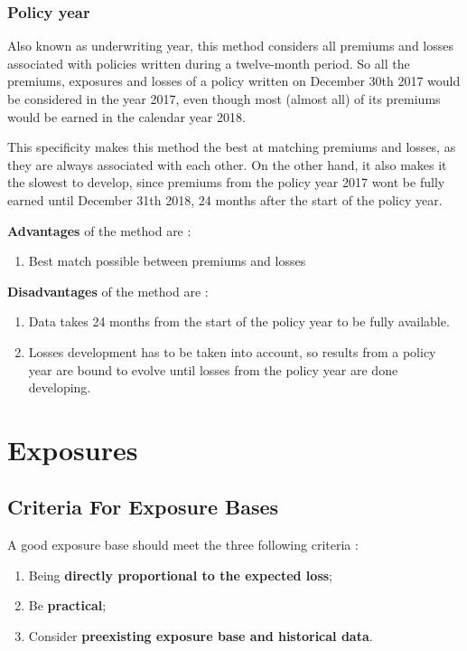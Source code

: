 \documentclass[11pt, english]{memoir}
\numberwithin{definition}{section}
\begin{document}
	
	
	\subsection{Policy year}
	Also known as underwriting year, this method considers all premiums and losses associated with policies written during a twelve-month period. So all the premiums, exposures and losses of a policy written on December 30th 2017 would be considered in the year 2017, even though most (almost all) of its premiums would be earned in the calendar year 2018. 
	
	This specificity makes this method the best at matching premiums and losses, as they are always associated with each other. On the other hand, it also makes it the slowest to develop, since premiums from the policy year 2017 wont be fully earned until December 31th 2018, 24 months after the start of the policy year. 
	
	\textbf{Advantages} of the method are :
	\begin{enumerate}
		\item Best match possible between premiums and losses
	\end{enumerate}
	
	\textbf{Disadvantages} of the method are : 
	\begin{enumerate}
		\item Data takes 24 months from the start of the policy year to be fully available. 
		\item Losses development has to be taken into account, so results from a policy year are bound to evolve until losses from the policy year are done developing. 
	\end{enumerate}
	
	
	
	
	
	
	
	
	
	
	
	\chapter{Exposures}
	
	\section{Criteria For Exposure Bases}
	A good exposure base should meet the three following criteria :
	\begin{enumerate}
		\item Being \textbf{directly proportional to the expected loss};
		\item Be \textbf{practical};
		\item Consider \textbf{preexisting exposure base and historical data}.
	\end{enumerate}
	
\end{document}
